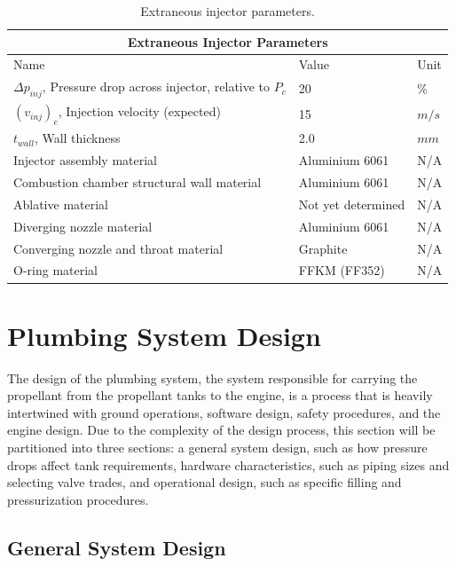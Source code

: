 \documentclass[9pt]{article} %
\numberwithin{equation}{section} %
\begin{document}
\begin{table}[!htb]
\centering
\begin{tabular}{  |p{8cm}||p{3cm}|p{1cm}|  }
\hline
\multicolumn{3}{|c|}{Extraneous Injector Parameters} \\
\hline
Name & Value & Unit \\ 
\hline
$\Delta p_{inj}$, Pressure drop across injector, relative to $P_{c}$ & 20 & \%  \\
$(v_{inj})_{e}$, Injection velocity (expected) & 15 &  $m/s$ \\
$t_{wall}$, Wall thickness & 2.0 & $mm$ \\
Injector assembly material & Aluminium 6061 & N/A \\
Combustion chamber structural wall material & Aluminium 6061 & N/A \\
Ablative material & Not yet determined & N/A \\
Diverging nozzle material & Aluminium 6061 & N/A \\
Converging nozzle and throat material & Graphite & N/A \\
O-ring material & FFKM (FF352) & N/A \\
\hline
\end{tabular}
\caption{Extraneous injector parameters.}
\label{table:injector_extraneous}
\end{table}

\section{Plumbing System Design}

The design of the plumbing system, the system responsible for carrying the propellant from the propellant tanks to the engine, is a process that is heavily intertwined with ground operations, software design, safety procedures, and the engine design. Due to the complexity of the design process, this section will be partitioned into three sections: a general system design, such as how pressure drops affect tank requirements, hardware characteristics, such as piping sizes and selecting valve trades, and operational design, such as specific filling and pressurization procedures.

\subsection{General System Design}
\end{document}
